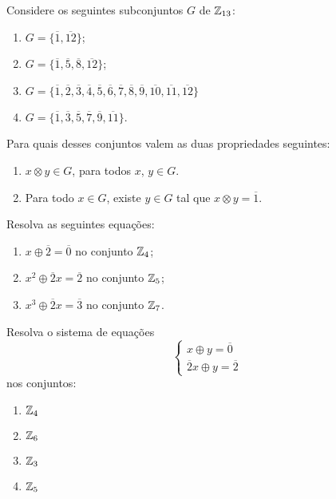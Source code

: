\documentclass[12pt]{exam}
\begin{document}
    \questao{} Considere os seguintes subconjuntos $G$ de $\mathbb{Z}_{13}$:
    \begin{multicols}{2}
        \begin{enumerate}[label=({\alph*})]
          \item $G=\{\overline{1},\overline{12}\}$;

          \item $G=\{\overline{1},\overline{5},\overline{8},\overline{12}\}$;

          \item $G=\{\overline{1},\overline{2},\overline{3},\overline{4}, \overline{5},\overline{6},\overline{7},
           \overline{8},\overline{9},\overline{10},\overline{11},\overline{12}\}$

         \item $G=\{\overline{1}, \overline{3},\overline{5},\overline{7},\overline{9},\overline{11}\}$.
      \end{enumerate}
    \end{multicols}

    Para quais desses conjuntos valem as duas propriedades seguintes:
    \begin{enumerate}[label=({\roman*})]
      \item $x \otimes y \in G$, para todos $x$, $y \in G$.
      \item Para todo $x \in G$, existe $y \in G$ tal que $x \otimes y = \overline{1}$.
    \end{enumerate}

    \vspace{.3cm}

    \questao{} Resolva as seguintes equações:
    \begin{enumerate}[label={\alph*})]
      \item $x \oplus \overline{2} = \overline{0}$ no conjunto $\mathbb{Z}_4$;
      \item $x^2 \oplus \overline{2}x = \overline{2}$ no conjunto $\mathbb{Z}_5$;
      \item $x^3 \oplus \overline{2}x = \overline{3}$ no conjunto $\mathbb{Z}_7$.
    \end{enumerate}

    \vspace{.3cm}

    \questao{} Resolva o sistema de equações
    \[
      \begin{cases}
        x \oplus y = \overline{0}\\
        \overline{2}x \oplus y = \overline{2}
      \end{cases}
    \]
    nos conjuntos:
    \begin{multicols}{2}
      \begin{enumerate}[label=({\alph*})]
          \item $\mathbb{Z}_4$
          \item $\mathbb{Z}_6$
          \item $\mathbb{Z}_3$
          \item $\mathbb{Z}_5$
      \end{enumerate}
    \end{multicols}
\end{document}
